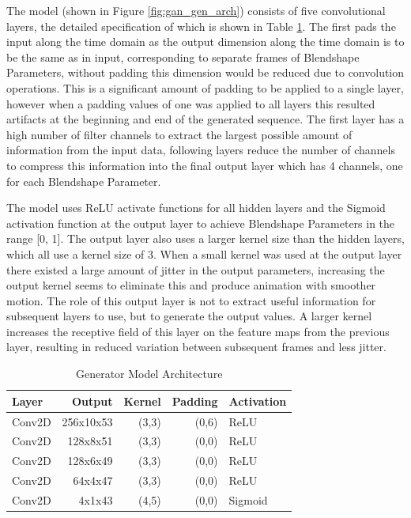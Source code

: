 The model (shown in Figure \ref{fig:gan_gen_arch}) consists of five convolutional layers, the detailed specification of which is shown in Table \ref{table:gan_gen_arch}.
The first pads the input along the time domain as the output dimension along the time domain is to be the same as in input, corresponding to separate frames of Blendshape Parameters, without padding this dimension would be reduced due to convolution operations.
This is a significant amount of padding to be applied to a single layer, however when a padding values of one was applied to all layers this resulted artifacts at the beginning and end of the generated sequence.
The first layer has a high number of filter channels to extract the largest possible amount of information from the input data, following layers reduce the number of channels to compress this information into the final output layer which has 4 channels, one for each Blendshape Parameter.

The model uses ReLU activate functions for all hidden layers and the Sigmoid activation function at the output layer to achieve Blendshape Parameters in the range [0, 1].
The output layer also uses a larger kernel size than the hidden layers, which all use a kernel size of 3.
When a small kernel was used at the output layer there existed a large amount of jitter in the output parameters, increasing the output kernel seems to eliminate this and produce animation with smoother motion.
The role of this output layer is not to extract useful information for subsequent layers to use, but to generate the output values.
A larger kernel increases the receptive field of this layer on the feature maps from the previous layer, resulting in reduced variation between subsequent frames and less jitter.

\begin{table}[h!]
\centering
    \begin{tabular}{ l | r | r | r | l}
    \textbf{Layer} & \textbf{Output} & \textbf{Kernel} & \textbf{Padding} & \textbf{Activation} \\ \hline
    Conv2D & 256x10x53 & (3,3) & (0,6) & ReLU    \\ \hline
    Conv2D & 128x8x51  & (3,3) & (0,0) & ReLU    \\ \hline
    Conv2D & 128x6x49  & (3,3) & (0,0) & ReLU    \\ \hline
    Conv2D & 64x4x47   & (3,3) & (0,0) & ReLU    \\ \hline
    Conv2D & 4x1x43    & (4,5) & (0,0) & Sigmoid 
    \end{tabular} 
    \caption{Generator Model Architecture}\label{table:gan_gen_arch}
\end{table}

